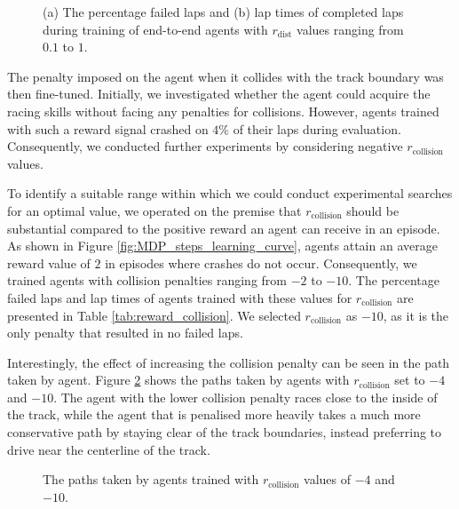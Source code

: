 \begin{figure}[htb!]
    \centering
    
    \caption[Learning curves of agents with different values for $r_{\text{dist}}$ during training]{(a) The percentage failed laps and (b) lap times of completed laps during training of end-to-end agents with $r_{\text{dist}}$ values ranging from $0.1$ to $1$.}
    \label{fig:reward_signal_dist}
\end{figure}


The penalty imposed on the agent when it collides with the track boundary was then fine-tuned. 
Initially, we investigated whether the agent could acquire the racing skills without facing any penalties for collisions. 
However, agents trained with such a reward signal crashed on $4\%$ of their laps during evaluation. 
Consequently, we conducted further experiments by considering negative $r_{\text{collision}}$ values.

To identify a suitable range within which we could conduct experimental searches for an optimal value, we operated on the premise that $r_{\text{collision}}$ should be substantial compared to the positive reward an agent can receive in an episode. 
As shown in Figure \ref{fig:MDP_steps_learning_curve}, agents attain an average reward value of $2$ in episodes where crashes do not occur. 
Consequently, we trained agents with collision penalties ranging from $-2$ to $-10$.
The percentage failed laps and lap times of agents trained with these values for $r_{\text{collision}}$ are presented in Table \ref{tab:reward_collision}.
We selected $r_{\text{collision}}$ as $-10$, as it is the only penalty that resulted in no failed laps.



Interestingly, the effect of increasing the collision penalty can be seen in the path taken by agent.
Figure \ref{fig:path_reward_collision} shows the paths taken by agents with $r_{\text{collision}}$ set to $-4$ and $-10$.
The agent with the lower collision penalty races close to the inside of the track, while the agent that is penalised more heavily takes a much more conservative path by staying clear of the track boundaries, instead preferring to drive near the centerline of the track.

\begin{figure}[htb!]
    \centering
    
    \caption[Paths taken by agents trained with different collision penalties]{The paths taken by agents trained with $r_{\text{collision}}$ values of $-4$ and $-10$.}
    \label{fig:path_reward_collision}
\end{figure}










